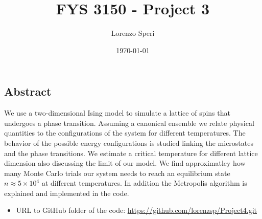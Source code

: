 \documentclass[%
preprint,
 amsmath,amssymb,
 aps,
]{revtex4-1}
\theoremstyle{plain}
\theoremstyle{definition}
\theoremstyle{plain}
\begin{document}
\title{FYS 3150 - Project 3}%


\author{Lorenzo Speri}
%


\date{\today}%
\maketitle

\begin{center}
\section{Abstract}
We use a two-dimensional Ising model to simulate a lattice of spins that undergoes a phase transition. Assuming a canonical ensemble we relate physical quantities to the configurations of the system for different temperatures. The behavior of the possible energy configurations is studied linking the microstates and the phase transitions. We estimate a critical temperature for different lattice dimension also discussing the limit of our model. We find approximatley how many Monte Carlo trials our system needs to reach an equilibrium state $n \approx 5 \times 10^4$ at different temperatures. In addition the Metropolis algorithm is explained and implemented in the code.
\end{center}


\begin{itemize}
\item URL to GitHub folder of the code: \url{https://github.com/lorenzsp/Project4.git}
\end{itemize}
\end{document}
